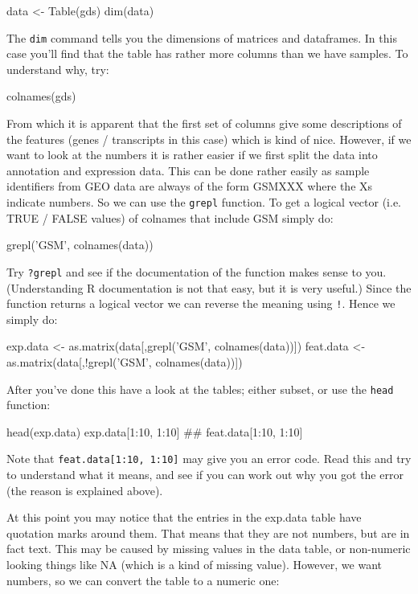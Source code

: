 \documentclass[11pt]{article}
\begin{document}
\begin{rcode}
  data <- Table(gds)
  dim(data)
\end{rcode}

The \texttt{dim} command tells you the dimensions of matrices and dataframes. In this
case you'll find that the table has rather more columns than we have samples. 
To understand why, try:

\begin{rcode}
  colnames(gds)
\end{rcode}

From which it is apparent that the first set of columns give some descriptions of the
features (genes / transcripts in this case) which is kind of nice. However, if we
want to look at the numbers it is rather easier if we first split the data into
annotation and expression data. This can be done rather easily as sample identifiers
from GEO data are always of the form GSMXXX where the Xs indicate numbers.
So we can use the \texttt{grepl} function. To get a logical vector (i.e. TRUE / FALSE
values) of colnames that include GSM simply do:

\begin{rcode}
  grepl('GSM', colnames(data))
\end{rcode}

Try \texttt{?grepl} and see if the documentation of the function makes sense
to you. (Understanding R documentation is not that easy, but it is very useful.)
Since the function returns a logical vector we can reverse the meaning using
\texttt{!}. Hence we simply do:

\begin{rcode}
  exp.data <- as.matrix(data[,grepl('GSM', colnames(data))])
  feat.data <- as.matrix(data[,!grepl('GSM', colnames(data))])
\end{rcode}

After you've done this have a look at the tables; either subset,
or use the \texttt{head} function:

\begin{rcode}
  head(exp.data)
  exp.data[1:10, 1:10]
  ##
  feat.data[1:10, 1:10]
\end{rcode}

Note that \texttt{feat.data[1:10, 1:10]} may give you an error code. Read this
and try to understand what it means, and see if you can work out why you got
the error (the reason is explained above).

At this point you may notice that the entries in the exp.data table have quotation
marks around them. That means that they are not numbers, but are in fact text.
This may be caused by missing values in the data table, or non-numeric looking
things like NA (which is a kind of missing value). However, we want numbers,
so we can convert the table to a numeric one:
\end{document}
